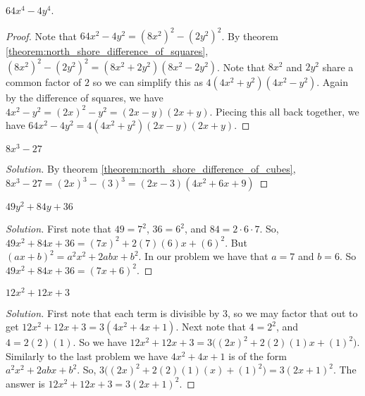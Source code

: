 \documentclass[../main.tex]{subfiles}
\begin{document}
%
\begin{problem}
$64x^4 - 4y^4$.
\end{problem}
\begin{proof}
Note that $64x^2 - 4y^2 = (8x^2)^2 - (2y^2)^2$. By theorem \ref{theorem:north_shore_difference_of_squares}, $(8x^2)^2 - (2y^2)^2 = (8x^2+2y^2)(8x^2 - 2y^2)$. Note that $8x^2$ and $2y^2$ share a common factor of $2$ so we can simplify this as $ 4(4x^2 +y^2)(4x^2-y^2)$. Again by the difference of squares, we have $4x^2 - y^2 = (2x)^2 - y^2 = (2x-y)(2x+y)$. Piecing this all back together, we have $64x^2 - 4y^2 = 4(4x^2 + y^2)(2x-y)(2x+y)$.
\end{proof}
%
\begin{problem}
$8x^3 - 27$
\end{problem}
\begin{proof}[Solution]
By theorem \ref{theorem:north_shore_difference_of_cubes}, $8x^3 - 27 = (2x)^3 - (3)^3 = (2x-3)(4x^2+6x+9)$
\end{proof}
%
\begin{problem}
$49y^2 + 84y + 36$
\end{problem}
\begin{proof}[Solution]
First note that $49 = 7^2$, $36 = 6^2$, and $84 = 2\cdot 6 \cdot 7$. So, $49x^2 + 84x + 36 = (7x)^2 + 2(7)(6)x + (6)^2$. But $(ax+b)^2 = a^2x^2 + 2abx + b^2$. In our problem we have that $a=7$ and $b = 6$. So $49x^2 + 84x + 36 = (7x+6)^2$.
\end{proof}
%
\begin{problem}
$12x^2 + 12x + 3$
\end{problem}
\begin{proof}[Solution]
First note that each term is divisible by $3$, so we may factor that out to get $12x^2 + 12x + 3 = 3(4x^2+4x+1)$. Next note that $4 = 2^2$, and $4 = 2(2)(1)$. So we have $12x^2+12x+3 = 3\big((2x)^2 + 2(2)(1)x + (1)^2\big)$. Similarly to the last problem we have $4x^2 + 4x + 1$ is of the form $a^2x^2 + 2abx + b^2$. So, $3\big((2x)^2+2(2)(1)(x) + (1)^2\big) = 3(2x+1)^2$. The answer is $12x^2+12x+3 = 3(2x+1)^2$.
\end{proof}
%
\end{document}
